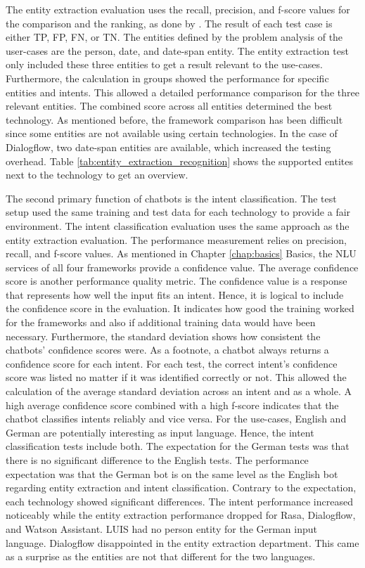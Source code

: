 The entity extraction evaluation uses the recall, precision, and f-score values for the comparison and the ranking, as done by \citet{braunEvaluatingNLU}.
The result of each test case is either TP, FP, FN, or TN.
The entities defined by the problem analysis of the user-cases are the person, date, and date-span entity.
The entity extraction test only included these three entities to get a result relevant to the use-cases.
Furthermore, the calculation in groups showed the performance for specific entities and intents. 
This allowed a detailed performance comparison for the three relevant entities.
The combined score across all entities determined the best technology.
As mentioned before, the framework comparison has been difficult since some entities are not available using certain technologies.
In the case of Dialogflow, two date-span entities are available, which increased the testing overhead.
Table \ref{tab:entity_extraction_recognition} shows the supported entites next to the technology to get an overview.

The second primary function of chatbots is the intent classification.
The test setup used the same training and test data for each technology to provide a fair environment.
The intent classification evaluation uses the same approach as the entity extraction evaluation.
The performance measurement relies on precision, recall, and f-score values.
As mentioned in Chapter \ref{chap:basics} Basics, the NLU services of all four frameworks provide a confidence value.
The average confidence score is another performance quality metric.
The confidence value is a response that represents how well the input fits an intent.
Hence, it is logical to include the confidence score in the evaluation.
It indicates how good the training worked for the frameworks and also if additional training data would have been necessary.
Furthermore, the standard deviation shows how consistent the chatbots' confidence scores were. 
As a footnote, a chatbot always returns a confidence score for each intent.
For each test, the correct intent's confidence score was listed no matter if it was identified correctly or not.
This allowed the calculation of the average standard deviation across an intent and as a whole.
A high average confidence score combined with a high f-score indicates that the chatbot classifies intents reliably and vice versa.
For the use-cases, English and German are potentially interesting as input language.
Hence, the intent classification tests include both.
The expectation for the German tests was that there is no significant difference to the English tests.
The performance expectation was that the German bot is on the same level as the English bot regarding entity extraction and intent classification.
Contrary to the expectation, each technology showed significant differences.
The intent performance increased noticeably while the entity extraction performance dropped for Rasa, Dialogflow, and Watson Assistant.
LUIS had no person entity for the German input language.
Dialogflow disappointed in the entity extraction department.
This came as a surprise as the entities are not that different for the two languages.
 

